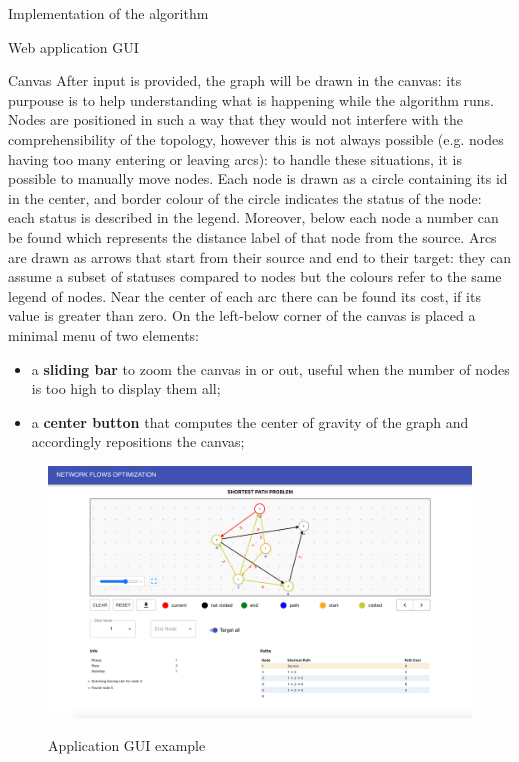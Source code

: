 \documentclass[9pt]{extarticle}
\begin{document}
\begin{section}{Implementation of the algorithm}
\begin{subsection}{Web application GUI}
            \begin{subsubsection}{Canvas}
                After input is provided, the graph will be drawn in the canvas: its purpouse is to help understanding what is happening while the algorithm
                runs.
                Nodes are positioned in such a way that they would not interfere with the comprehensibility of the topology, however this is not always possible (e.g.
                nodes having too many entering or leaving arcs): to handle these situations, it is possible to manually move nodes.
                Each node is drawn as a circle containing its id in the center, and border colour of the circle indicates the status of the node: each status is
                described in the legend.
                Moreover, below each node a number can be found which represents the distance label of that node from the source.
                Arcs are drawn as arrows that start from their source and end to their target: they can assume a subset of statuses compared to nodes but the
                colours refer to the same legend of nodes. Near the center of each arc there can be found its cost, if its value is greater than zero.
                On the left-below corner of the canvas is placed a minimal menu of two elements:
                \begin{itemize}
                    \item a \textbf{sliding bar} to zoom the canvas in or out, useful when the number of nodes is too high to display them all;
                    \item a \textbf{center button} that computes the center of gravity of the graph and accordingly repositions the canvas;
                \end{itemize}
            \end{subsubsection}
            
            \begin{figure}[h]
                \includegraphics[scale=0.23]{gui2.png}
                \centering
                \begin{description}
                    \centering
                    \item[Figure 4] Application GUI example
                \end{description}
            \end{figure}


\end{subsection}
\end{section}
\end{document}
